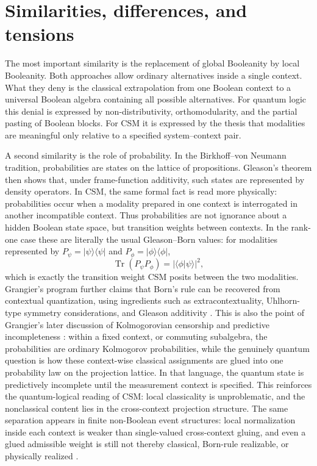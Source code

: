 \documentclass[
aps,
pra,
reprint,
superscriptaddress,
nofootinbib,
longbibliography
]{revtex4-2}
\begin{document}
\section{Similarities, differences, and tensions}

The most important similarity is the replacement of global Booleanity by local
Booleanity.  Both approaches allow ordinary alternatives inside a single
context.  What they deny is the classical extrapolation from one Boolean
context to a universal Boolean algebra containing all possible alternatives.
For quantum logic this denial is expressed by non-distributivity,
orthomodularity, and the partial pasting of Boolean blocks.  For CSM it is
expressed by the thesis that modalities are meaningful only relative to a
specified system--context pair.

A second similarity is the role of probability.  In the
Birkhoff--von Neumann tradition, probabilities are states on the lattice of
propositions.  Gleason's theorem then shows that, under frame-function
additivity, such states are represented by density operators.  In CSM, the
same formal fact is read more physically: probabilities occur when a modality
prepared in one context is interrogated in another incompatible context.
Thus probabilities are not ignorance about a hidden Boolean state space, but
transition weights between contexts.  In the rank-one case these are literally
the usual Gleason--Born values: for modalities represented by
$P_\psi=|\psi\rangle\langle\psi|$ and
$P_\phi=|\phi\rangle\langle\phi|$,
\begin{equation}
\operatorname{Tr}(P_\psi P_\phi)=|\langle\phi|\psi\rangle|^2 ,
\end{equation}
which is exactly the transition weight CSM posits between the two modalities.
Grangier's program further claims that Born's rule can be recovered from
contextual quantization, using ingredients such as extracontextuality,
Uhlhorn-type symmetry considerations, and Gleason additivity
\cite{uhlhorn1963,auffeves2016,auffeves2017,grangier2022}.
This is also the point of Grangier's later discussion of Kolmogorovian
censorship and predictive incompleteness \cite{grangier2025kc}: within a
fixed context, or commuting subalgebra, the probabilities are ordinary
Kolmogorov probabilities, while the genuinely quantum question is how these
context-wise classical assignments are glued into one probability law on the
projection lattice.  In that language, the quantum state is predictively
incomplete until the measurement context is specified.  This reinforces the
quantum-logical reading of CSM: local classicality is unproblematic, and the
nonclassical content lies in the cross-context projection structure.
The same separation appears in finite non-Boolean event structures:
local normalization inside each context is weaker than single-valued
cross-context gluing, and even a glued admissible weight is still not thereby
classical, Born-rule realizable, or physically realized \cite{svozil2026softmax}.
\end{document}
